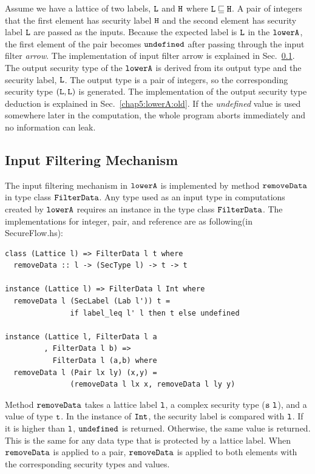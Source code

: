 \documentclass[a4paper]{report}
\newcommand{\co}[1]{$\cod{#1}$}
\begin{document}
%
%
Assume we have a lattice of two labels, \co{L} and \co{H} where $\mathtt{L}\sqsubseteq \mathtt{H}$. A pair of 
integers that the first element has security label \co{H} and the second element has security label \co{L} are 
passed as the inputs.
Because the expected label is \co{L} in the \co{lowerA}, the first element of the pair becomes \co{undefined}
after passing through the input filter {\em arrow}. The implementation of input filter arrow is explained in
Sec.~\ref{chap5:lowerA:ifm}. The output
security type of the \co{lowerA} is derived from its output type and the security label, \co{L}. 
The output type is a pair of integers, so
the corresponding security type $(\mathtt{L},\mathtt{L})$ is generated. The implementation of the output security type 
deduction is explained in Sec.~\ref{chap5:lowerA:old}.
If the {\em undefined} value is used somewhere later in the computation, the whole program
aborts immediately and no information can leak.

\subsection{Input Filtering Mechanism}
\label{chap5:lowerA:ifm}
The input filtering mechanism in \co{lowerA} is implemented by 
method \co{removeData} in type class \co{FilterData}. Any type used as an input type in computations created by
\co{lowerA} requires an instance in the type class \co{FilterData}. The implementations for integer, pair,
and reference are as following(in SecureFlow.hs):
\begin{Verbatim}[fontsize=\footnotesize]
class (Lattice l) => FilterData l t where
  removeData :: l -> (SecType l) -> t -> t

instance (Lattice l) => FilterData l Int where
  removeData l (SecLabel (Lab l')) t = 
               if label_leq l' l then t else undefined

instance (Lattice l, FilterData l a
         , FilterData l b) =>
           FilterData l (a,b) where
  removeData l (Pair lx ly) (x,y) = 
               (removeData l lx x, removeData l ly y)
\end{Verbatim}
Method \co{removeData} takes a lattice label \co{l}, a complex security type (\co{s~l}), and a value of 
type \co{t}. In the instance of \co{Int}, the security label is compared with \co{l}. If it is higher 
than \co{l}, \co{undefined} is returned. Otherwise, the same value is returned. This is the same for any 
data type that is protected by a lattice label.
When \co{removeData} is applied to a pair, \co{removeData} is applied to both elements
with the corresponding security types and values.
\end{document}
